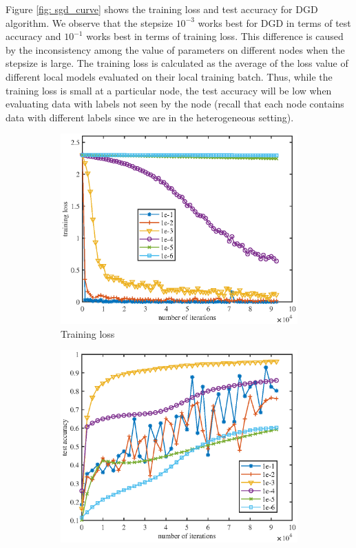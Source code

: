 \documentclass{article} %
\begin{document}
Figure \ref{fig: sgd_curve} shows the training loss and test accuracy for DGD algorithm.
We observe that the stepsize $10^{-3}$ works best for DGD in terms of test accuracy and $10^{-1}$ works best in terms of training loss. 
This difference is caused by the inconsistency among the value of parameters on different nodes when the stepsize is large. 
The training loss is calculated as the average of the loss value of different local models evaluated on their local training batch. 
Thus, while the training loss is small at a particular node, the test accuracy will be low when evaluating data with labels not seen by the node (recall that each node contains data with different labels since we are in the heterogeneous setting).


\begin{figure}[H]
\centering
	\begin{subfigure}{.45\textwidth}
	\centering
	\includegraphics[width=\textwidth]{figures/sgd_train.eps}
	\caption{\small Training loss}
	\end{subfigure}
\begin{subfigure}{.45\textwidth}
	\centering
		\includegraphics[width=\textwidth]{figures/sgd_test.eps}

\end{subfigure}
\end{figure}
\end{document}
